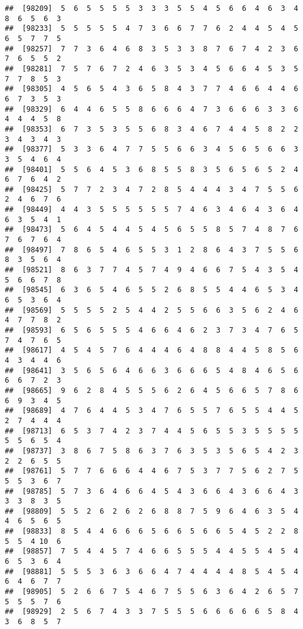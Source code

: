 \documentclass[
]{book}
\begin{document}
\begin{verbatim}
##  [98209]  5  6  5  5  5  5  3  3  3  5  5  4  5  6  6  4  6  3  4  8  6  5  6  3
##  [98233]  5  5  5  5  5  4  7  3  6  6  7  7  6  2  4  4  5  4  5  6  5  7  7  5
##  [98257]  7  7  3  6  4  6  8  3  5  3  3  8  7  6  7  4  2  3  6  7  6  5  5  2
##  [98281]  7  5  7  6  7  2  4  6  3  5  3  4  5  6  6  4  5  3  5  7  7  8  5  3
##  [98305]  4  5  6  5  4  3  6  5  8  4  3  7  7  4  6  6  4  4  6  6  7  3  5  3
##  [98329]  6  4  4  6  5  5  8  6  6  6  4  7  3  6  6  6  3  3  6  4  4  4  5  8
##  [98353]  6  7  3  5  3  5  5  6  8  3  4  6  7  4  4  5  8  2  2  3  4  3  4  3
##  [98377]  5  3  3  6  4  7  7  5  5  6  6  3  4  5  6  5  6  6  3  3  5  4  6  4
##  [98401]  5  5  6  4  5  3  6  8  5  5  8  3  5  6  5  6  5  2  4  6  7  6  4  2
##  [98425]  5  7  7  2  3  4  7  2  8  5  4  4  4  3  4  7  5  5  6  2  4  6  7  6
##  [98449]  4  4  3  5  5  5  5  5  5  7  4  6  3  4  6  4  3  6  4  6  3  5  4  1
##  [98473]  5  6  4  5  4  4  5  4  5  6  5  5  8  5  7  4  8  7  6  7  6  7  6  4
##  [98497]  7  8  6  5  4  6  5  5  3  1  2  8  6  4  3  7  5  5  6  8  3  5  6  4
##  [98521]  8  6  3  7  7  4  5  7  4  9  4  6  6  7  5  4  3  5  4  5  6  6  7  8
##  [98545]  6  3  6  5  4  6  5  5  2  6  8  5  5  4  4  6  5  3  4  6  5  3  6  4
##  [98569]  5  5  5  5  2  5  4  4  2  5  5  6  6  3  5  6  2  4  6  4  7  7  8  2
##  [98593]  6  5  6  5  5  5  4  6  6  4  6  2  3  7  3  4  7  6  5  7  4  7  6  5
##  [98617]  4  5  4  5  7  6  4  4  4  6  4  8  8  4  4  5  8  5  6  4  3  4  4  6
##  [98641]  3  5  6  5  6  4  6  6  3  6  6  6  5  4  8  4  6  5  6  6  6  7  2  3
##  [98665]  9  6  2  8  4  5  5  5  6  2  6  4  5  6  6  5  7  8  6  6  9  3  4  5
##  [98689]  4  7  6  4  4  5  3  4  7  6  5  5  7  6  5  5  4  4  5  2  7  4  4  4
##  [98713]  6  5  3  7  4  2  3  7  4  4  5  6  5  5  3  5  5  5  5  5  5  6  5  4
##  [98737]  3  8  6  7  5  8  6  3  7  6  3  5  3  5  6  5  4  2  3  2  2  6  5  5
##  [98761]  5  7  7  6  6  6  4  4  6  7  5  3  7  7  5  6  2  7  5  5  5  3  6  7
##  [98785]  5  7  3  6  4  6  6  4  5  4  3  6  6  4  3  6  6  4  3  3  3  8  3  5
##  [98809]  5  5  2  6  2  6  2  6  8  8  7  5  9  6  4  6  3  5  4  4  6  5  6  5
##  [98833]  8  5  4  4  6  6  6  5  6  6  5  6  6  5  4  5  2  2  8  5  5  4 10  6
##  [98857]  7  5  4  4  5  7  4  6  6  5  5  5  4  4  5  5  4  5  4  6  5  3  6  4
##  [98881]  5  5  5  3  6  3  6  6  4  7  4  4  4  4  8  5  4  5  4  6  4  6  7  7
##  [98905]  5  2  6  6  7  5  4  6  7  5  5  6  3  6  4  2  6  5  7  5  5  5  7  6
##  [98929]  2  5  6  7  4  3  3  7  5  5  5  6  6  6  6  6  5  8  4  3  6  8  5  7

\end{verbatim}
\end{document}
